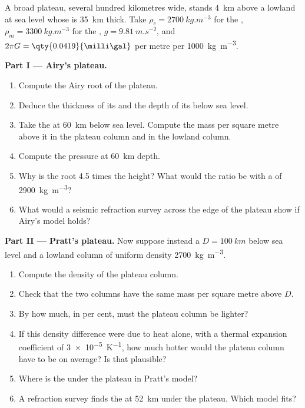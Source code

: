 \begin{problem}
\label{pb:b1:isostasy-gravity:1}
A broad plateau, several hundred kilometres wide, stands \qty{4}{km} above a
lowland at sea level whose  is \qty{35}{km} thick. Take
$\rho_c = \qty{2700}{kg.m^{-3}}$ for the , $\rho_m = \qty{3300}{kg.m^{-3}}$
for the , $g = \qty{9.81}{m.s^{-2}}$, and
$2\pi G = \qty{0.0419}{\milli\gal}$ per metre per \qty{1000}{kg.m^{-3}}.

\medskip
\noindent\textbf{Part I --- Airy's plateau.}
\begin{enumerate}
  \item Compute the Airy root of the plateau.
  \item Deduce the thickness of its  and the depth of its  below sea
        level.
  \item Take the  at \qty{60}{km} below sea level. Compute the
        mass per square metre above it in the plateau column and in the lowland
        column.
  \item Compute the pressure at \qty{60}{km} depth.
  \item Why is the root 4.5 times the height? What would the ratio be with a
         of \qty{2900}{kg.m^{-3}}?
  \item What would a seismic refraction survey across the edge of the plateau
        show if Airy's model holds?
\end{enumerate}

\noindent\textbf{Part II --- Pratt's plateau.}
Now suppose instead a  $D = \qty{100}{km}$ below sea level and
a lowland column of uniform density \qty{2700}{kg.m^{-3}}.
\begin{enumerate}[resume]
  \item Compute the density of the plateau column.
  \item Check that the two columns have the same mass per square metre above
        $D$.
  \item By how much, in per cent, must the plateau column be lighter?
  \item If this density difference were due to heat alone, with a thermal
        expansion coefficient of \qty{3e-5}{K^{-1}}, how much hotter would the
        plateau column have to be on average? Is that plausible?
  \item Where is the  under the plateau in Pratt's model?
  \item A refraction survey finds the  at \qty{52}{km} under the plateau.
        Which model fits?
\end{enumerate}


\end{problem}
